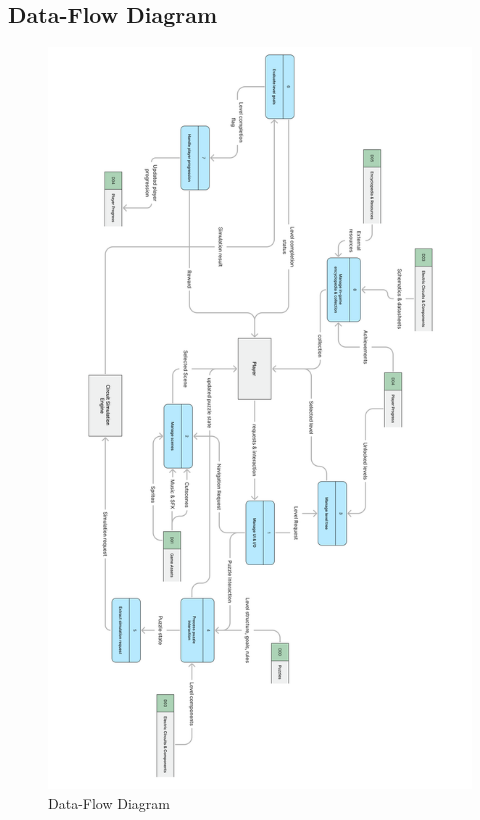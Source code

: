\documentclass[../main.tex]{subfiles}
\begin{document}
\subsection{Data-Flow Diagram}
\begin{figure}[ht!]
\centering
\includegraphics[scale=0.13]{images/chapter3/DFD.png}
\caption{Data-Flow Diagram}
\label{Data-Flow Diagram}
\end{figure}
\vfill
\newpage
\end{document}

